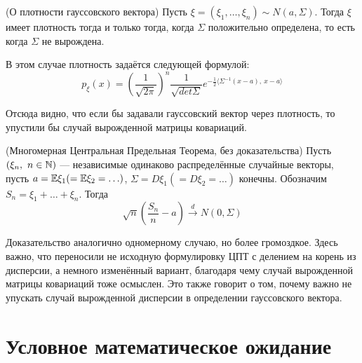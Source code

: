 \begin{exercise} (О плотности гауссовского вектора)
    Пусть $\xi = (\xi_1, \ldots, \xi_n) \sim N(a, \Sigma)$. Тогда $\xi$ имеет плотность тогда и только тогда, когда $\Sigma$ положительно определена, то есть когда $\Sigma$ не вырождена.

    В этом случае плотность задаётся следующей формулой:
    \[
        p_\xi(x) = \left( \frac{1}{\sqrt{2\pi}} \right)^n \frac{1}{\sqrt{det \Sigma}} e^{-\frac{1}{2} \langle \Sigma^{-1}(x-a),\ x-a \rangle}
    \]
\end{exercise}

\begin{note}
    Отсюда видно, что если бы задавали гауссовский вектор через плотность, то упустили бы случай вырожденной матрицы ковариаций.
\end{note}

\begin{theorem} (Многомерная Центральная Предельная Теорема, без доказательства)
    Пусть $(\xi_n,\ n \in \mathbb{N})$ --- независимые одинаково распределённые случайные векторы, пусть $a = \mathbb{E}\xi_1 (= \mathbb{E}\xi_2 = \ldots)$, $\Sigma = D\xi_1 (= D\xi_2 = \ldots)$ конечны. Обозначим $S_n = \xi_1 + \ldots + \xi_n$. Тогда
    \[
        \sqrt{n} \left( \frac{S_n}{n} - a \right) \xrightarrow{d} N(0, \Sigma)
    \]
\end{theorem}

\begin{note}
    Доказательство аналогично одномерному случаю, но более громоздкое. Здесь важно, что переносили не исходную формулировку ЦПТ с делением на корень из дисперсии, а немного изменённый вариант, благодаря чему случай вырожденной матрицы ковариаций тоже осмыслен. Это также говорит о том, почему важно не упускать случай вырожденной дисперсии в определении гауссовского вектора.
\end{note}

\section{Условное математическое ожидание}

